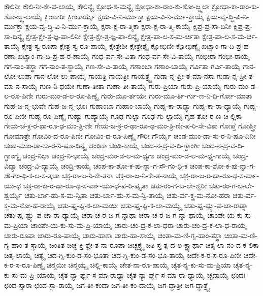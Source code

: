 {ಕೌಲಿನೀ
ಕೌಲಿ-ನೀ-ಕೇ-ವ-ಲಾಯೈ
ಕೌಲಿನ್ಯೈ
ಕ್ರೋಧ-ಶ-ಮನ್ಯೈ
ಕ್ರೋಧಾ-ಕಾ-ರಾಂ-ಕು-ಶೋ-ಜ್ಜ್ವಲಾ
ಕ್ರೋಧಾ-ಕಾ-ರಾಂ-ಕು-ಶೋ-ಜ್ಜ್ವ-ಲಾಯೈ
ಕ್ಲೀಂಕಾರೀ
ಕ್ಲೀಂಕಾರ್ಯೈ
ಕ್ಷಯ-ವಿ-ನಿ-ರ್ಮುಕ್ತಾ
ಕ್ಷಯ-ವಿ-ನಿ-ರ್ಮು-ಕ್ತಾಯೈ
ಕ್ಷಯ-ವೃ-ದ್ಧಿ-ವಿ-ನಿ-ರ್ಮುಕ್ತಾ
ಕ್ಷಯ-ವೃ-ದ್ಧಿ-ವಿ-ನಿ-ರ್ಮು-ಕ್ತಾಯೈ
ಕ್ಷರಾ-ಕ್ಷ-ರಾ-ತ್ಮಿಕಾ
ಕ್ಷರಾ-ಕ್ಷ-ರಾ-ತ್ಮಿ-ಕಾಯೈ
ಕ್ಷಿಪ್ರ-ಪ್ರ-ಸಾ-ದಿನೀ
ಕ್ಷಿಪ್ರ-ಪ್ರ-ಸಾ-ದಿನ್ಯೈ
ಕ್ಷೇತ್ರ-ಕ್ಷೇ-ತ್ರ-ಜ್ಞ-ಪಾ-ಲಿನೀ
ಕ್ಷೇತ್ರ-ಕ್ಷೇ-ತ್ರ-ಜ್ಞ-ಪಾ-ಲಿನ್ಯೈ
ಕ್ಷೇತ್ರ-ಪಾ-ಲ-ಸ-ಮ-ರ್ಚಿತಾ
ಕ್ಷೇತ್ರ-ಪಾ-ಲ-ಸ-ಮ-ರ್ಚಿ-ತಾಯೈ
ಕ್ಷೇತ್ರ-ಸ್ವ-ರೂಪಾ
ಕ್ಷೇತ್ರ-ಸ್ವ-ರೂ-ಪಾಯೈ
ಕ್ಷೇತ್ರೇಶೀ
ಕ್ಷೇತ್ರೇಶ್ಯೈ
ಕ್ಷೋಭಿಣೀ
ಕ್ಷೋಭಿಣ್ಯೈ
ಖಟ್ವಾಂ-ಗಾ-ದಿ-ಪ್ರ-ಹ-ರಣಾ
ಖಟ್ವಾಂ-ಗಾ-ದಿ-ಪ್ರ-ಹ-ರ-ಣಾಯೈ
ಗಂಧ-ರ್ವ-ಸೇ-ವಿತಾ
ಗಂಧ-ರ್ವ-ಸೇ-ವಿ-ತಾಯೈ
ಗಂಭೀರಾ
ಗಂಭೀ-ರಾಯೈ
ಗಗ-ನಾಂ-ತಸ್ಥಾ
ಗಗ-ನಾಂ-ತ-ಸ್ಥಾಯೈ
ಗಣ-ಸೇ-ವಿ-ತಾಯೈ
ಗಣಾಂಬಾ
ಗಣಾಂ-ಬಾಯೈ
ಗರ್ವಿತಾ
ಗರ್ವಿ-ತಾಯೈ
ಗಾನ-ಲೋ-ಲುಪಾ
ಗಾನ-ಲೋ-ಲು-ಪಾಯೈ
ಗಾಯತ್ರಿ
ಗಾಯತ್ರೀ
ಗಾಯತ್ರ್ಯೈ
ಗುಡಾ-ನ್ನ-ಪ್ರೀ-ತ-ಮಾ-ನಸಾ
ಗುಡಾ-ನ್ನ-ಪ್ರೀ-ತ-ಮಾ-ನ-ಸಾಯೈ
ಗುಣ-ನಿ-ಧಯೇ
ಗುಣಾ-ತೀತಾ
ಗುಣಾ-ತೀ-ತಾಯೈ
ಗುರು-ಪ್ರಿಯಾ
ಗುರು-ಪ್ರಿ-ಯಾಯೈ
ಗುರು-ಮಂ-ಡ-ಲ-ರೂ-ಪಿಣೀ
ಗುರು-ಮಂ-ಡ-ಲ-ರೂ-ಪಿಣ್ಯೈ
ಗುರು-ಮೂ-ರ್ತಯೇ
ಗುರು-ಮೂ-ರ್ತಿ-ರ್ಗು-ಣ-ನಿ-ಧಿ-ರ್ಗೋ-ಮಾತಾ
ಗುಹ-ಜ-ನ್ಮ-ಭುವೇ
ಗುಹ-ಜ-ನ್ಮ-ಭೂಃ
ಗುಹಾಂಬಾ
ಗುಹಾಂ-ಬಾಯೈ
ಗುಹ್ಯ-ಕಾ-ರಾಧ್ಯಾ
ಗುಹ್ಯ-ಕಾ-ರಾ-ಧ್ಯಾಯೈ
ಗುಹ್ಯ-ರೂ-ಪಿಣೀ
ಗುಹ್ಯ-ರೂ-ಪಿಣ್ಯೈ
ಗುಹ್ಯಾ
ಗುಹ್ಯಾಯೈ
ಗೂಢ-ಗುಲ್ಫಾ
ಗೂಢ-ಗು-ಲ್ಫಾಯೈ
ಗೃಹ-ತೋ-ರ-ಣ-ಚಿ-ಲ್ಲಿಕಾ
ಗೇಯ-ಚ-ಕ್ರ-ರ-ಥಾ-ರೂ-ಢ-ಮಂ-ತ್ರಿ-ಣೀ
ಗೇಯ-ಚ-ಕ್ರ-ರ-ಥಾ-ರೂ-ಢ-ಮಂ-ತ್ರಿ-ಣೀ-ಪ-ರಿ-ಸೇ-ವಿತಾ
ಗೋಪ್ತೆ
ಗೋಪ್ತ್ರೀ
ಗೋಮಾತ್ರೇ
ಗೋವಿಂ-ದ-ರೂ-ಪಿಣೀ
ಗೋವಿಂ-ದ-ರೂ-ಪಿಣ್ಯೈ
ಗೌರೀ
ಗೌರ್ಯೈ
ಚಂಡ-ಮುಂ-ಡಾ-ಸು-ರ-ನಿ-ಷೂ-ದಿನೀ
ಚಂಡ-ಮುಂ-ಡಾ-ಸು-ರ-ನಿ-ಷೂ-ದಿನ್ಯೈ
ಚಂಡಿಕಾ
ಚಂಡಿ-ಕಾಯೈ
ಚಂದ-ನ-ದ್ರ-ವ-ದಿ-ಗ್ಧಾಂಗೀ
ಚಂದ-ನ-ದ್ರ-ವ-ದಿ-ಗ್ಧಾಂಗ್ಯೈ
ಚಂದ್ರ-ನಿಭಾ
ಚಂದ್ರ-ನಿ-ಭಾಯೈ
ಚಂದ್ರ-ಮಂ-ಡ-ಲ-ಮ-ಧ್ಯಗಾ
ಚಂದ್ರ-ಮಂ-ಡ-ಲ-ಮ-ಧ್ಯ-ಗಾಯೈ
ಚಂದ್ರ-ವಿದ್ಯಾ
ಚಂದ್ರ-ವಿ-ದ್ಯಾಯೈ
ಚಂದ್ರಿ-ಕಾಯೈ
ಚಂಪ-ಕಾ-ಶೋ-ಕ-ಪು-ನ್ನಾ-ಗ-ಸೌ-ಗಂ-ಧಿ-ಕ
ಚಂಪ-ಕಾ-ಶೋ-ಕ-ಪು-ನ್ನಾ-ಗ-ಸೌ-ಗಂ-ಧಿ-ಕ-ಲ-ಸ-ತ್ಕಚಾ
ಚಕ್ರ-ರಾ-ಜ-ನಿ-ಕೇ-ತನಾ
ಚಕ್ರ-ರಾ-ಜ-ನಿ-ಕೇ-ತ-ನಾಯೈ
ಚಕ್ರ-ರಾ-ಜ-ರ-ಥಾ-ರೂ-ಢ-ಸ-ರ್ವಾ-ಯು-ಧ
ಚಕ್ರ-ರಾ-ಜ-ರ-ಥಾ-ರೂ-ಢ-ಸ-ರ್ವಾ-ಯು-ಧ-ಪ-ರಿ-ಷ್ಕೃತಾ
ಚತು-ರಂ-ಗ-ಬ-ಲೇ-ಶ್ವರೀ
ಚತು-ರಂ-ಗ-ಬ-ಲೇ-ಶ್ವರ್ಯೈ
ಚತು-ರ್ಬಾ-ಹು-ಸ-ಮ-ನ್ವಿತಾ
ಚತು-ರ್ಬಾ-ಹು-ಸ-ಮ-ನ್ವಿ-ತಾಯೈ
ಚತು-ರ್ವ-ಕ್ತ್ರ-ಮ-ನೋ-ಹರಾ
ಚತು-ರ್ವ-ಕ್ತ್ರ-ಮ-ನೋ-ಹ-ರಾಯೈ
ಚತು-ಷ್ಷ-ಷ್ಟಿ-ಕ-ಲಾ-ಮಯೀ
ಚತು-ಷ್ಷ-ಷ್ಟಿ-ಕ-ಲಾ-ಮಯ್ಯೈ
ಚತು-ಷ್ಷ-ಷ್ಟ್ಯು-ಪ-ಚಾ-ರಾಢ್ಯಾ
ಚತು-ಷ್ಷ-ಷ್ಟ್ಯು-ಪ-ಚಾ-ರಾ-ಢ್ಯಾಯೈ
ಚರಾ-ಚ-ರ-ಜ-ಗ-ನ್ನಾಥಾ
ಚರಾ-ಚ-ರ-ಜ-ಗ-ನ್ನಾ-ಥಾಯೈ
ಚಾಂಪೇ-ಯ-ಕು-ಸು-ಮ-ಪ್ರಿಯಾ
ಚಾಂಪೇ-ಯ-ಕು-ಸು-ಮ-ಪ್ರಿ-ಯಾಯೈ
ಚಾರು-ಚಂ-ದ್ರ-ಕ-ಲಾ-ಧರಾ
ಚಾರು-ಚಂ-ದ್ರ-ಕ-ಲಾ-ಧ-ರಾಯೈ
ಚಾರು-ರೂಪಾ
ಚಾರು-ರೂ-ಪಾಯೈ
ಚಾರು-ಹಾಸಾ
ಚಾರು-ಹಾ-ಸಾಯೈ
ಚಿಂತಾ-ಮ-ಣಿ-ಗೃ-ಹಾಂ-ತಸ್ಥಾ
ಚಿಂತಾ-ಮ-ಣಿ-ಗೃ-ಹಾಂ-ತ-ಸ್ಥಾಯೈ
ಚಿಂತಿತ
ಚಿಚ್ಛ-ಕ್ತಿ-ಶ್ಚೇ-ತ-ನಾ-ರೂಪಾ
ಚಿಚ್ಛಕ್ತ್ಯೈ
ಚಿತಿ-ಸ್ತ-ತ್ಪ-ದ-ಲ-ಕ್ಷ್ಯಾರ್ಥಾ
ಚಿತ್ಕ-ಲಾ-ನಂ-ದ-ಕ-ಲಿಕಾ
ಚಿತ್ಕ-ಲಾಯೈ
ಚಿತ್ಯೈ
ಚಿದ-ಗ್ನಿ-ಕುಂ-ಡ-ಸಂ-ಭೂತಾ
ಚಿದ-ಗ್ನಿ-ಕುಂ-ಡ-ಸಂ-ಭೂ-ತಾಯೈ
ಚಿದೇ-ಕ-ರ-ಸ-ರೂ-ಪಿಣೀ
ಚಿದೇ-ಕ-ರ-ಸ-ರೂ-ಪಿಣ್ಯೈ
ಚಿನ್ಮಯೀ
ಚಿನ್ಮಯ್ಯೈ
ಚಿಲ್ಲಿ-ಕಾಯೈ
ಚೇತ-ನಾ-ರೂ-ಪಾಯೈ
ಚೈತ-ನ್ಯ-ಕು-ಸು-ಮ-ಪ್ರಿಯಾ
ಚೈತ-ನ್ಯ-ಕು-ಸು-ಮ-ಪ್ರಿ-ಯಾಯೈ
ಚೈತ-ನ್ಯಾ-ರ್ಘ್ಯ-ಸ-ಮಾ-ರಾಧ್ಯಾ
ಚೈತ-ನ್ಯಾ-ರ್ಘ್ಯ-ಸ-ಮಾ-ರಾ-ಧ್ಯಾಯೈ
ಚ್ಛದಾಯೈ
ಛಂದಃ
ಛಂದ-ಸ್ಸಾರಾ
ಛಂದ-ಸ್ಸಾ-ರಾಯೈ
ಜಗ-ತೀ-ಕಂದಾ
ಜಗ-ತೀ-ಕಂ-ದಾಯೈ
ಜಗ-ದ್ಧಾತ್ರೀ
ಜಗ-ದ್ಧಾತ್ರ್ಯೈ
}
